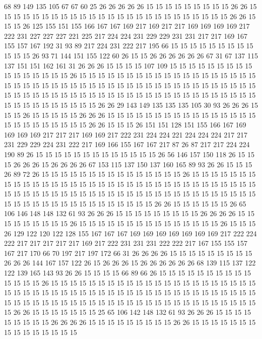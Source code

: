 68 89 149 135 105 67 67 60 25 26 26 26 26 26 15 15 15 15 15 15
15 15 15 26 26 15 15 15 15 15 15 15 15 15 15 15 15 15 15 15
15 15 15 15 15 15 15 15 15 15 26 26 15 15 15 26 125 155 151 155
166 167 167 169 217 169 217 217 169 169 169 169 217 222 231 227 227 227 221 225
217 224 224 231 229 229 231 231 217 217 169 167 155 157 167 192 31 93 89 217
224 231 222 217 195 66 15 15 15 15 15 15 15 15 15 15 15 15 26 93
71 144 151 155 122 60 26 15 15 26 26 26 26 26 26 67 31 67 137 115
137 151 151 162 161 31 26 26 26 15 15 15 15 107 109 15 15 15 15 15
15 15 15 15 15 15 15 15 15 15 15 26 15 15 15 15 15 15 15 15
15 15 15 15 15 15 15 15 15 15 15 15 15 15 15 15 15 15 15 15
15 15 15 15 15 15 15 15 15 15 15 15 15 15 15 15 15 15 15 15
15 15 15 15 15 15 15 15 15 15 15 15 15 15 15 15 15 15 15 15
15 15 15 15 15 15 15 15 15 15 15 15 15 15 15 26 26 29 143 149
135 135 135 105 30 93 26 26 26 15 15 15 26 15 15 15 15 15 26 26
26 15 15 15 15 15 15 15 15 15 15 15 15 15 15 15 15 15 15 15
15 15 15 15 15 15 26 26 15 15 15 26 151 151 128 151 155 166 167 169
169 169 169 217 217 217 169 169 217 222 231 224 224 221 224 224 224 217 217 231
229 229 224 231 222 217 169 166 155 167 167 217 87 26 87 217 217 224 224 190
89 26 15 15 15 15 15 15 15 15 15 15 15 15 15 26 56 146 157 150
118 26 15 15 15 26 26 26 15 26 26 26 26 67 153 115 137 150 137 160
165 89 93 26 26 15 15 15 26 89 72 26 15 15 15 15 15 15 15 15
15 15 15 15 15 15 15 26 15 15 15 15 15 15 15 15 15 15 15 15
15 15 15 15 15 15 15 15 15 15 15 15 15 15 15 15 15 15 15 15
15 15 15 15 15 15 15 15 15 15 15 15 15 15 15 15 15 15 15 15
15 15 15 15 15 15 15 15 15 15 15 15 15 15 15 15 15 15 15 15
15 15 15 15 15 26 26 15 15 15 15 15 15 26 65 106 146 148 148 132
61 93 26 26 26 15 15 15 15 15 15 15 15 15 26 26 26 26 15 15
15 15 15 15 15 15 15 26 15 15 15 15 15 15 15 15 15 15 15 15
15 15 15 26 15 15 15 26 129 122 120 122 128 155 167 167 167 169 169 169
169 169 169 169 217 222 224 222 217 217 217 217 217 169 217 222 231 231 231 222
222 217 167 155 155 157 167 217 170 66 70 197 217 197 172 66 31 26 26 26
26 15 15 15 15 15 15 15 15 15 26 26 26 144 167 157 122 26 15 26
26 26 15 26 26 26 26 26 26 68 139 115 137 122 122 139 165 143 93 26
26 15 15 15 15 66 89 66 26 15 15 15 15 15 15 15 15 15 15 15
15 15 15 26 15 15 15 15 15 15 15 15 15 15 15 15 15 15 15 15
15 15 15 15 15 15 15 15 15 15 15 15 15 15 15 15 15 15 15 15
15 15 15 15 15 15 15 15 15 15 15 15 15 15 15 15 15 15 15 15
15 15 15 15 15 15 15 15 15 15 15 15 15 15 15 15 15 15 15 15
15 26 26 15 15 15 15 15 15 15 25 65 106 142 148 132 61 93 26 26
26 15 15 15 15 15 15 15 15 15 26 26 26 26 15 15 15 15 15 15
15 15 15 26 26 15 15 15 15 15 15 15 15 15 15 15 15 15 15 15
